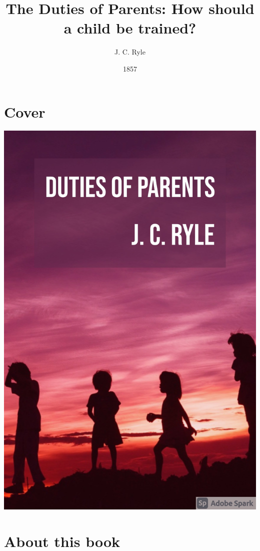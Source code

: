 \documentclass[
]{book}
\title{The Duties of Parents: How should a child be trained?}
\author{J. C. Ryle}
\date{1857}
\begin{document}
\maketitle

\mainmatter

{
\setcounter{tocdepth}{1}
\tableofcontents
}
\hypertarget{cover}{%
\chapter*{Cover}\label{cover}}

\includegraphics{cover.jpg}

\hypertarget{about-this-book}{%
\chapter*{About this book}\label{about-this-book}}
\end{document}
